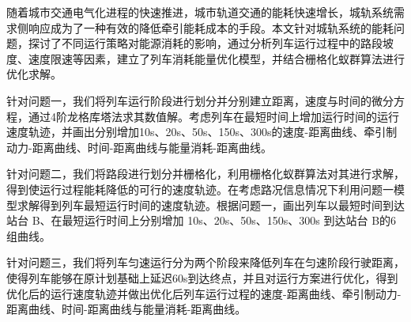 

随着城市交通电气化进程的快速推进，城市轨道交通的能耗快速增长，城轨系统需求侧响应成为了一种有效的降低牵引能耗成本的手段。本文针对城轨系统的能耗问题，探讨了不同运行策略对能源消耗的影响，通过分析列车运行过程中的路段坡度、速度限速等因素，建立了列车消耗能量优化模型，并结合栅格化蚁群算法进行优化求解。

针对问题一，我们将列车运行阶段进行划分并分别建立距离，速度与时间的微分方程，通过4阶龙格库塔法求其数值解。考虑列车在最短时间上增加运行时间的运行速度轨迹，并画出分别增加10s、20s、50s、150s、300s的速度-距离曲线、牵引制动力-距离曲线、时间-距离曲线与能量消耗-距离曲线。

针对问题二，我们将路段进行划分并栅格化，利用栅格化蚁群算法对其进行求解，得到使运行过程能耗降低的可行的速度轨迹。在考虑路况信息情况下利用问题一模型求解得到列车最短运行时间的速度轨迹。根据问题一，画出列车以最短时间到达站台 B、在最短运行时间上分别增加 10s、20s、50s、150s、300s 到达站台 B的6组曲线。

针对问题三，我们将列车匀速运行分为两个阶段来降低列车在匀速阶段行驶距离，使得列车能够在原计划基础上延迟60s到达终点，并且对运行方案进行优化，得到优化后的运行速度轨迹并做出优化后列车运行过程的速度-距离曲线、牵引制动力-距离曲线、时间-距离曲线与能量消耗-距离曲线。






